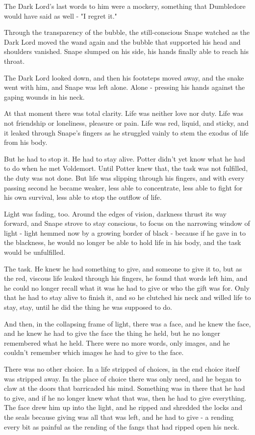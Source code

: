 \documentclass[a4paper,11pt]{article}
\begin{document}
The Dark Lord's last words to him were a mockery, something that Dumbledore would have said as well - "I regret it."

Through the transparency of the bubble, the still-conscious Snape watched as the Dark Lord moved the wand again and the bubble that supported his head and shoulders vanished. Snape slumped on his side, his hands finally able to reach his throat.

The Dark Lord looked down, and then his footsteps moved away, and the snake went with him, and Snape was left alone. Alone - pressing his hands against the gaping wounds in his neck.

At that moment there was total clarity. Life was neither love nor duty. Life was not friendship or loneliness, pleasure or pain. Life was red, liquid, and sticky, and it leaked through Snape's fingers as he struggled vainly to stem the exodus of life from his body.

But he had to stop it. He had to stay alive. Potter didn't yet know what he had to do when he met Voldemort. Until Potter knew that, the task was not fulfilled, the duty was not done. But life was slipping through his fingers, and with every passing second he became weaker, less able to concentrate, less able to fight for his own survival, less able to stop the outflow of life.

Light was fading, too. Around the edges of vision, darkness thrust its way forward, and Snape strove to stay conscious, to focus on the narrowing window of light - light hemmed now by a growing border of black - because if he gave in to the blackness, he would no longer be able to hold life in his body, and the task would be unfulfilled.

The task. He knew he had something to give, and someone to give it to, but as the red, viscous life leaked through his fingers, he found that words left him, and he could no longer recall what it was he had to give or who the gift was for. Only that he had to stay alive to finish it, and so he clutched his neck and willed life to stay, stay, until he did the thing he was supposed to do.

And then, in the collapsing frame of light, there was a face, and he knew the face, and he knew he had to give the face the thing he held, but he no longer remembered what he held. There were no more words, only images, and he couldn't remember which images he had to give to the face.

There was no other choice. In a life stripped of choices, in the end choice itself was stripped away. In the place of choice there was only need, and he began to claw at the doors that barricaded his mind. Something was in there that he had to give, and if he no longer knew what that was, then he had to give everything. The face drew him up into the light, and he ripped and shredded the locks and the seals because giving was all that was left, and he had to give - a rending every bit as painful as the rending of the fangs that had ripped open his neck.
\end{document}
